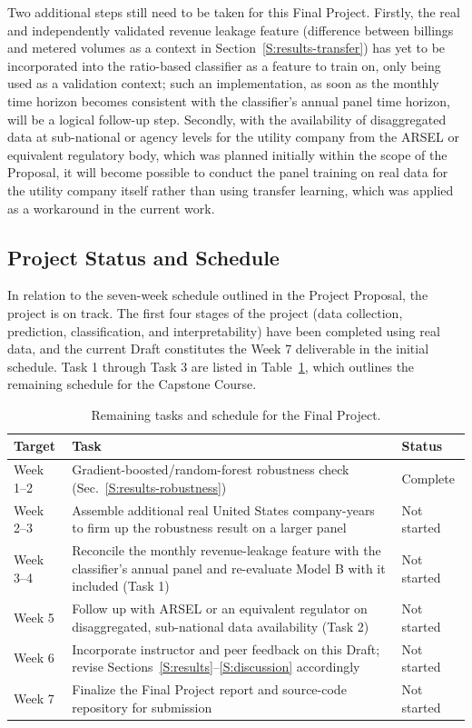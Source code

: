 \documentclass[final,1p,times]{elsarticle}
\begin{document}
Two additional steps still need to be taken for this Final Project. Firstly, the real and independently validated revenue leakage feature (difference between billings and metered volumes as a context in Section~\ref{S:results-transfer}) has yet to be incorporated into the ratio-based classifier as a feature to train on, only being used as a validation context; such an implementation, as soon as the monthly time horizon becomes consistent with the classifier's annual panel time horizon, will be a logical follow-up step. Secondly, with the availability of disaggregated data at sub-national or agency levels for the utility company from the ARSEL or equivalent regulatory body, which was planned initially within the scope of the Proposal, it will become possible to conduct the panel training on real data for the utility company itself rather than using transfer learning, which was applied as a workaround in the current work.

\subsection{Project Status and Schedule}
\label{S:schedule}

In relation to the seven-week schedule outlined in the Project Proposal, the project is on track. The first four stages of the project (data collection, prediction, classification, and interpretability) have been completed using real data, and the current Draft constitutes the Week 7 deliverable in the initial schedule. Task 1 through Task 3 are listed in Table~\ref{tab:schedule}, which outlines the remaining schedule for the Capstone Course.

\begin{table}[h]
\centering
\small
\caption{Remaining tasks and schedule for the Final Project.}
\label{tab:schedule}
\begin{tabular}{p{1.6cm} p{5.7cm} p{1.3cm}}
\toprule
\textbf{Target} & \textbf{Task} & \textbf{Status} \\
\midrule
Week 1--2 & Gradient-boosted/random-forest robustness check (Sec.~\ref{S:results-robustness}) & Complete \\
Week 2--3 & Assemble additional real United States company-years to firm up the robustness result on a larger panel & Not started \\
Week 3--4 & Reconcile the monthly revenue-leakage feature with the classifier's annual panel and re-evaluate Model B with it included (Task 1) & Not started \\
Week 5 & Follow up with ARSEL or an equivalent regulator on disaggregated, sub-national data availability (Task 2) & Not started \\
Week 6 & Incorporate instructor and peer feedback on this Draft; revise Sections~\ref{S:results}--\ref{S:discussion} accordingly & Not started \\
Week 7 & Finalize the Final Project report and source-code repository for submission & Not started \\
\bottomrule
\end{tabular}
\end{table}
\end{document}
